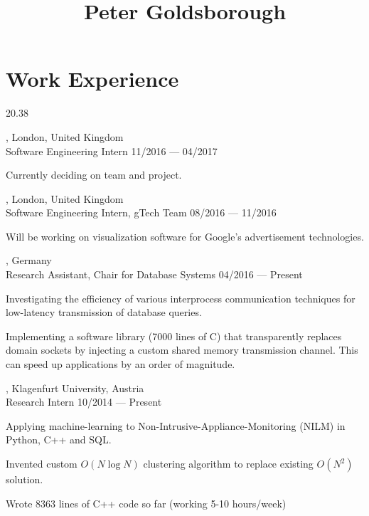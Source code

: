 




\begin{header}
	\title{Peter Goldsborough}
	\separate
	\separate
\end{header}

\section{Work Experience}{2}{0.38}

\begin{entry}
	{, London, United Kingdom}
	{\\Software Engineering Intern}
	{11/2016 --- 04/2017}
	\item Currently deciding on team and project.
\end{entry}

\begin{entry}
	{, London, United Kingdom}
	{\\Software Engineering Intern, gTech Team}
	{08/2016 --- 11/2016}
	\item Will be working on visualization software for Google's advertisement technologies.
\end{entry}

\begin{entry}
	{, Germany}
	{\\Research Assistant, Chair for Database Systems}
	{04/2016 --- Present}

  \item Investigating the efficiency of various interprocess communication techniques for low-latency transmission of database queries.
  \item Implementing a software library (7000 lines of C) that transparently replaces domain sockets by injecting a custom shared memory transmission channel. This can speed up applications by an order of magnitude.
\end{entry}

\begin{entry}
	{, Klagenfurt University, Austria}
	{\\Research Intern}
	{10/2014 --- Present}

\item Applying machine-learning to Non-Intrusive-Appliance-Monitoring (NILM) in Python, C++ and SQL.
	\item Invented custom $O(N \log N)$ clustering algorithm to replace existing $O(N^2)$ solution.
	\item Wrote 8363 lines of C++ code so far (working 5-10 hours/week)
\end{entry}

